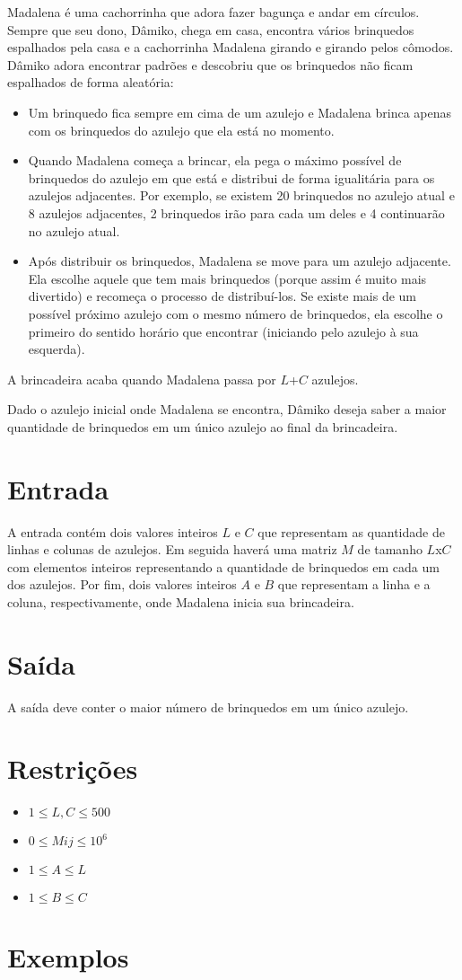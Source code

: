 Madalena é uma cachorrinha que adora fazer bagunça e andar em círculos. Sempre que seu dono, Dâmiko, chega em casa, encontra vários brinquedos espalhados pela casa e a cachorrinha Madalena girando e girando pelos cômodos.
Dâmiko adora encontrar padrões e descobriu que os brinquedos não ficam espalhados de forma aleatória:

\begin{itemize}
  \item Um brinquedo fica sempre em cima de um azulejo e Madalena brinca apenas com os brinquedos do azulejo que ela está no momento.
  \item Quando Madalena começa a brincar, ela pega o máximo possível de brinquedos do azulejo em que está e distribui de forma igualitária para os azulejos adjacentes. Por exemplo, se existem 20 brinquedos no azulejo atual e 8 azulejos adjacentes, 2 brinquedos irão para cada um deles e 4 continuarão no azulejo atual.
  \item Após distribuir os brinquedos, Madalena se move para um azulejo adjacente. Ela escolhe aquele que tem mais brinquedos (porque assim é muito mais divertido) e recomeça o processo de distribuí-los. Se existe mais de um possível próximo azulejo com o mesmo número de brinquedos, ela escolhe o primeiro do sentido horário que encontrar (iniciando pelo azulejo à sua esquerda).
\end{itemize}

A brincadeira acaba quando Madalena passa por $L$+$C$ azulejos.

Dado o azulejo inicial onde Madalena se encontra, Dâmiko deseja saber a maior quantidade de brinquedos em um único azulejo ao final da brincadeira.

\section*{Entrada}

A entrada contém dois valores inteiros $L$ e $C$ que representam as quantidade de linhas e colunas de azulejos. Em seguida haverá uma matriz $M$ de tamanho $L$x$C$ com elementos inteiros representando a quantidade de brinquedos em cada um dos azulejos.
Por fim, dois valores inteiros $A$ e $B$ que representam a linha e a coluna, respectivamente, onde Madalena inicia sua brincadeira.

\section*{Saída}

A saída deve conter o maior número de brinquedos em um único azulejo.


\section*{Restrições}

\begin{itemize}
\item $1 \leq L, C \leq 500$
\item $0 \leq Mij \leq 10^6$
\item $1 \leq A \leq L$
\item $1 \leq B \leq C$
\end{itemize}


\section*{Exemplos}

\exemplo

